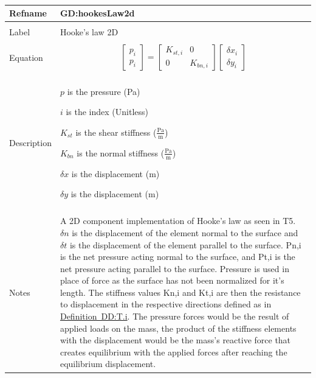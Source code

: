 \documentclass[12pt]{article}
\begin{document}
~\newline
\noindent \begin{minipage}{\textwidth}
\begin{tabular}{p{} p{}}
\toprule \textbf{Refname} & \textbf{GD:hookesLaw2d}
\label{GD:hookesLaw2d}
\\ \midrule \\
Label & Hooke's law 2D
\\ \midrule \\
Equation & \begin{dmath}
           \begin{bmatrix}
p_{i}\\
p_{i}
\end{bmatrix}=\begin{bmatrix}
{K_{st,i}} & 0\\
0 & {K_{bn,i}}
\end{bmatrix} \begin{bmatrix}
{δx}_{i}\\
{δy}_{i}
\end{bmatrix}
           \end{dmath}
\\ \midrule \\
Description & \begin{symbDescription}
              \item{$p$ is the pressure (Pa)}
              \item{$i$ is the index (Unitless)}
              \item{${K_{st}}$ is the shear stiffness ($\frac{\text{Pa}}{\text{m}}$)}
              \item{${K_{bn}}$ is the normal stiffness ($\frac{\text{Pa}}{\text{m}}$)}
              \item{$δx$ is the displacement (m)}
              \item{$δy$ is the displacement (m)}
              \end{symbDescription}
\\ \midrule \\
Notes & A 2D component implementation of Hooke's law as seen in T5. $δn$ is the displacement of the element normal to the surface and $δt$ is the displacement of the element parallel to the surface. Pn,i is the net pressure acting normal to the surface, and Pt,i is the net pressure acting parallel to the surface. Pressure is used in place of force as the surface has not been normalized for it's length. The stiffness values Kn,i and Kt,i are then the resistance to displacement in the respective directions defined as in \hyperref[DD:T.i]{Definition~DD:T.i}. The pressure forces would be the result of applied loads on the mass, the product of the stiffness elements with the displacement would be the mass's reactive force that creates equilibrium with the applied forces after reaching the equilibrium displacement.

\end{tabular}
\end{minipage}
\end{document}
